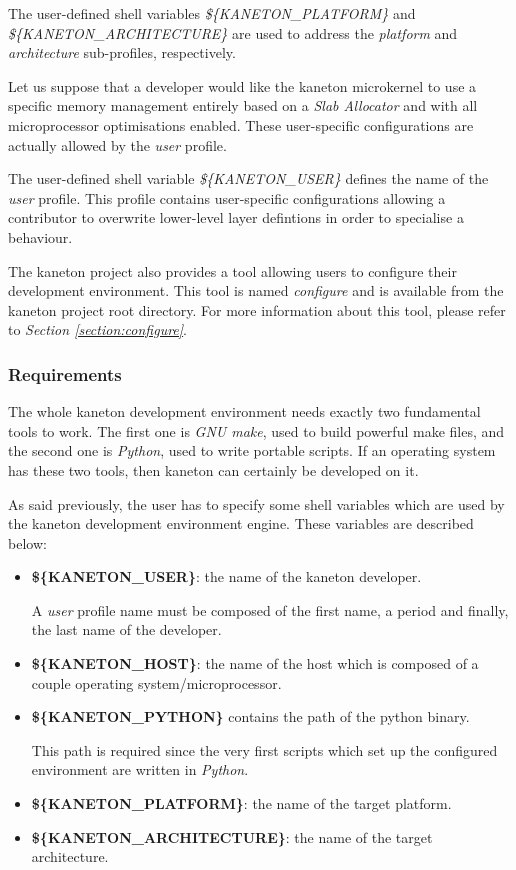 The user-defined shell variables \textit{\$\{KANETON\_PLATFORM\}} and
\textit{\$\{KANETON\_ARCHITECTURE\}} are used to address the \textit{platform}
and \textit{architecture} sub-profiles, respectively.



Let us suppose that a developer would like the kaneton microkernel to
use a specific memory management entirely based on a \textit{Slab Allocator}
and with all microprocessor optimisations enabled. These user-specific
configurations are actually allowed by the \textit{user} profile.

The user-defined shell variable \textit{\$\{KANETON\_USER\}} defines the name
of the \textit{user} profile. This profile contains user-specific
configurations allowing a contributor to overwrite lower-level layer defintions
in order to specialise a behaviour.

The kaneton project also provides a tool allowing users to configure
their development environment. This tool is named \textit{configure} and is
available from the kaneton project root directory. For more information about
this tool, please refer to \textit{Section \ref{section:configure}}.


%
%

\subsubsection{Requirements}

The whole kaneton development environment needs exactly two fundamental tools
to work. The first one is \textit{GNU make}, used to build powerful make files,
and the second one is \textit{Python}, used to write portable scripts. If an
operating system has these two tools, then kaneton can certainly be developed
on it.

As said previously, the user has to specify some shell variables which are
used by the kaneton development environment engine. These variables are
described below:

\begin{itemize}
  \item
    \textbf{\$\{KANETON\_USER\}}: the name of the kaneton developer.

    A \textit{user} profile name must be composed of the first name, a period
    and finally, the last name of the developer.
  \item
    \textbf{\$\{KANETON\_HOST\}}: the name of the host which is composed of
    a couple operating system/microprocessor.
  \item
    \textbf{\$\{KANETON\_PYTHON\}} contains the path of the python binary.

    This path is required since the very first scripts which set up the
    configured environment are written in \textit{Python}.
  \item
    \textbf{\$\{KANETON\_PLATFORM\}}: the name of the target platform.
  \item
    \textbf{\$\{KANETON\_ARCHITECTURE\}}: the name of the target architecture.
\end{itemize}

